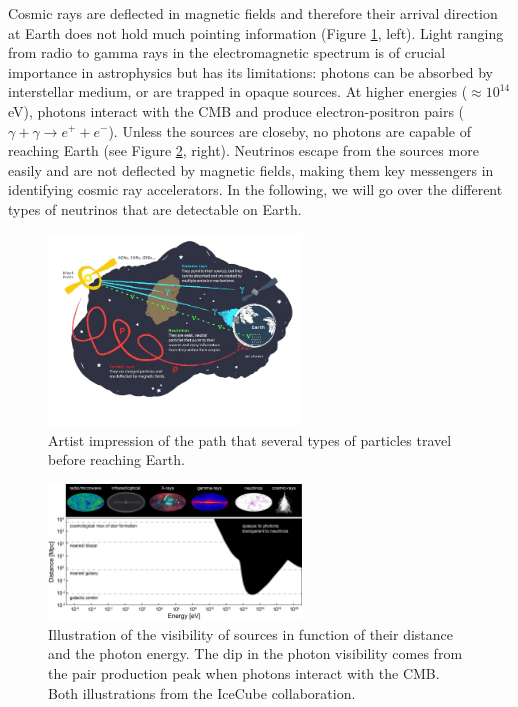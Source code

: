 Cosmic rays are deflected in magnetic fields and therefore their arrival direction at Earth does not hold much pointing information (Figure \ref{fig:sourceinfo}, left). Light ranging from radio to gamma rays in the electromagnetic spectrum is of crucial importance in astrophysics but has its limitations: photons can be absorbed by interstellar medium, or are trapped in opaque sources. At higher energies ($\approx 10^{14}$ eV), photons interact with the CMB and produce electron-positron pairs ($\gamma + \gamma \rightarrow e^+ + e^-$). Unless the sources are closeby, no photons are capable of reaching Earth (see Figure \ref{fig:opaquephotons}, right). Neutrinos escape from the sources more easily and are not deflected by magnetic fields, making them key messengers in identifying cosmic ray accelerators. In the following, we will go over the different types of neutrinos that are detectable on Earth.


\begin{figure}[t]
\centering
\includegraphics[width=0.6\textwidth]{chapter3/img/sourceinformation_3.jpg}
\caption{Artist impression of the path that several types of particles travel before reaching Earth.}
\label{fig:sourceinfo}
\end{figure}

\begin{figure}[t]
\centering
\includegraphics[width=0.6\textwidth]{chapter3/img/opaque-to-photons.png}
\caption{Illustration of the visibility of sources in function of their distance and the photon energy. The dip in the photon visibility comes from the pair production peak when photons interact with the CMB. Both illustrations from the IceCube collaboration.}
\label{fig:opaquephotons}
\end{figure}

